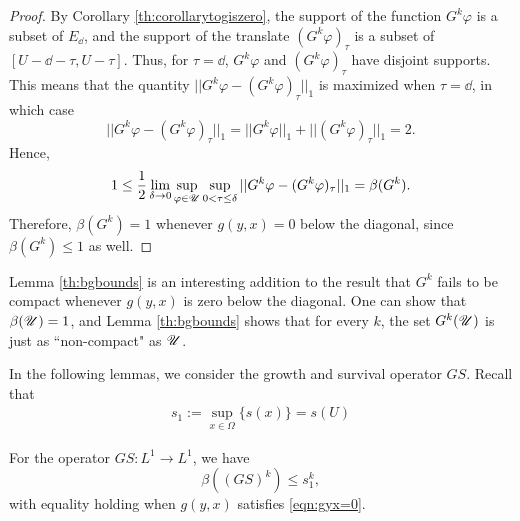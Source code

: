 \begin{proof}
	By Corollary \ref{th:corollarytogiszero}, the support of the function $G^k \varphi$  is a subset of $E_\dd$, and the support of the translate $(G^k\varphi)_\tau$ is a subset of $[U-\dd-\tau,U-\tau]$. Thus, for $\tau=\dd$, $G^k\varphi$ and $(G^k\varphi)_\tau$ have disjoint supports. This means that the quantity $||G^k\varphi-(G^k\varphi)_\tau||_1$ is maximized when $\tau=\dd$, in which case
	\[||G^k\varphi-(G^k\varphi)_\tau||_1= ||G^k\varphi||_1 + ||(G^k\varphi)_\tau||_1 = 2.\]
	Hence,
	\[1 \leq \frac 12 \lim_{\delta \to 0} \sup_{\varphi \in \mathscr U} \sup_{0<\tau \leq \delta} ||G^k\varphi-(G^k\varphi)_{\tau}||_1 = \beta(G^k).\]
	Therefore, $\beta(G^k) =1$ whenever $g(y,x) =0$ below the diagonal, since $\beta(G^k) \leq 1$ as well.
	
\end{proof}

Lemma \ref{th:bgbounds} is an interesting addition to the result that $G^k$ fails to be compact whenever $g(y,x)$ is zero below the diagonal. One can show that $\beta(\mathscr U) = 1$, and Lemma \ref{th:bgbounds} shows that for every $k$, the set $G^k(\mathscr U)$ is just as ``non-compact" as $\mathscr U$.

In the following lemmas, we consider the growth and survival operator $GS$. Recall that 
\begin{align}
	s_1:= \sup_{x \in \Omega} \{s(x)\} = s(U) \label{eqn:s1def}
\end{align}

\begin{lemma} \label{th:bgsbounds}
	For the operator $GS:L^1 \to L^1$, we have
	\[\beta((GS)^k) \leq s_1^k,\]
	with equality holding when $g(y,x)$ satisfies \eqref{eqn:gyx=0}.
\end{lemma}

